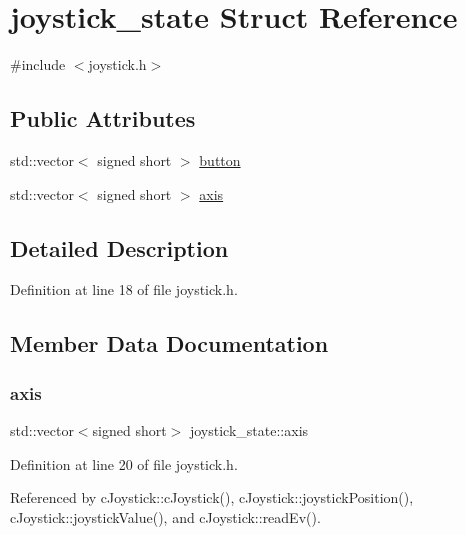 \hypertarget{structjoystick__state}{}\section{joystick\+\_\+state Struct Reference}
\label{structjoystick__state}


{\ttfamily \#include $<$joystick.\+h$>$}

\subsection*{Public Attributes}
\begin{DoxyCompactItemize}
\item 
std\+::vector$<$ signed short $>$ \hyperlink{structjoystick__state_af16d0e2bea842ab4fafa05ce23f45f56}{button}
\item 
std\+::vector$<$ signed short $>$ \hyperlink{structjoystick__state_acc10718083ec5603bfcca9d1780239f2}{axis}
\end{DoxyCompactItemize}


\subsection{Detailed Description}


Definition at line 18 of file joystick.\+h.



\subsection{Member Data Documentation}
\mbox{\label{structjoystick__state_acc10718083ec5603bfcca9d1780239f2}} 
\subsubsection{\texorpdfstring{axis}{axis}}
{\footnotesize\ttfamily std\+::vector$<$signed short$>$ joystick\+\_\+state\+::axis}



Definition at line 20 of file joystick.\+h.



Referenced by c\+Joystick\+::c\+Joystick(), c\+Joystick\+::joystick\+Position(), c\+Joystick\+::joystick\+Value(), and c\+Joystick\+::read\+Ev().

